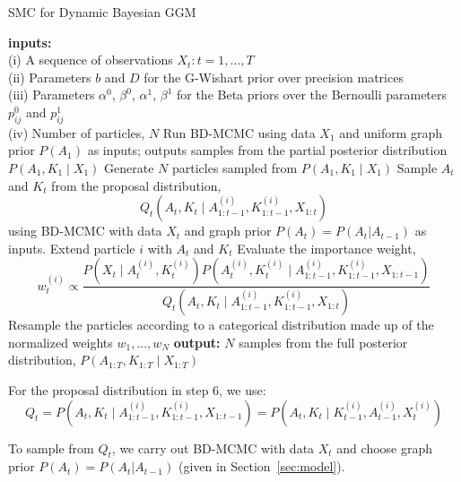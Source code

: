 \documentclass{article}
\begin{document}
\begin{algorithm}[h!tbp]
\caption{SMC for Dynamic Bayesian GGM}
\label{alg:smc}
\begin{algorithmic}[1]
\STATE \textbf{inputs:} \\(i) A sequence of observations $X_t : t = 1,...,T$ \\(ii) Parameters $b$ and $D$ for the G-Wishart prior over precision matrices \\(iii) Parameters $\alpha^0$, $\beta^0$, $\alpha^1$, $\beta^1$ for the Beta priors over the Bernoulli parameters $p_{ij}^0$ and $p_{ij}^1$ \\(iv) Number of particles, $N$
\STATE Run BD-MCMC using data $X_1$ and uniform graph prior $P(A_{1})$ as inputs; outputs samples from the partial posterior distribution $P(A_1,K_1 \mid X_1)$
\STATE Generate $N$ particles sampled from $P(A_1,K_1 \mid X_1)$
\STATE Sample $A_t$ and $K_t$ from the proposal distribution, $$Q_t(A_t,K_t \mid A_{1:t-1}^{(i)},K_{1:t-1}^{(i)},X_{1:t})$$ using BD-MCMC with data $X_{t}$ and graph prior $P(A_{t}) = P(A_{t}|A_{t-1})$ as inputs.
\STATE Extend particle $i$ with $A_t$ and $K_t$
\STATE Evaluate the importance weight, $$w_t^{(i)} \propto \frac{P(X_t \mid A_t^{(i)}, K_t^{(i)}) P(A_t^{(i)}, K_t^{(i)} \mid A_{1:t-1}^{(i)}, K_{1:t-1}^{(i)}, X_{1:t-1})}{Q_t(A_t,K_t \mid A_{1:t-1}^{(i)},K_{1:t-1}^{(i)},X_{1:t})}$$
\ENDFOR
\STATE Resample the particles according to a categorical distribution made up of the normalized weights $w_1,...,w_N$
\ENDFOR
\STATE \textbf{output:} $N$ samples from the full posterior distribution, $P(A_{1:T},K_{1:T} \mid X_{1:T})$
\end{algorithmic}
\label{alg:smc}
\end{algorithm}

For the proposal distribution in step 6, we use: 
$$Q_t = P(A_t, K_t \mid A_{1:t-1}^{(i)},K_{1:t-1}^{(i)},X_{1:t-1}) = P(A_t, K_t \mid K_{t-1}^{(i)}, A_{t-1}^{(i)}, X_{t}^{(i)})$$

To sample from $Q_t$, we carry out BD-MCMC with data $X_t$ and choose graph prior $P(A_{t}) = P(A_{t}|A_{t-1})$ (given in Section~\ref{sec:model}).
\end{document}
